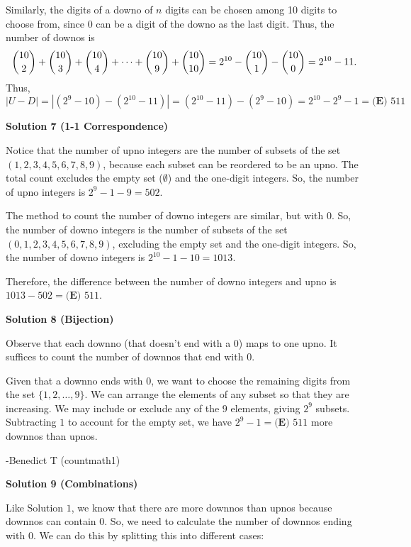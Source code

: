 \begin{enumerate}
 Similarly, the digits of a downo of $n$ digits can be chosen among 10 digits to choose from, since $0$ can be a digit of the downo as the last digit. Thus, the number of downos is 
 \[\binom{10}{2} + \binom{10}{3} + \binom{10}{4} + \cdots + \dbinom{10}{9} + \dbinom{10}{10} = 2^{10} - \binom{10}{1} - \binom{10}{0} = 2^{10} - 11.\] Thus, 
 \[|U - D| = |(2^9 - 10) - (2^{10} - 11)| = (2^{10} - 11) - (2^9 - 10) = 2^{10} - 2^9 - 1 = \boxed{\textbf{(E) }511}\]




\textbf{Solution 7 (1-1 Correspondence)}

Notice that the number of upno integers are the number of subsets of the set $(1, 2, 3, 4, 5, 6, 7, 8, 9)$, because each subset can be reordered to be an upno. The total count excludes the empty set ($\emptyset$) and the one-digit integers. So, the number of upno integers is $2^9-1-9=502$.

 The method to count the number of downo integers are similar, but with $0$. So, the number of downo integers is the number of subsets of the set $(0, 1, 2, 3, 4, 5, 6, 7, 8, 9)$, excluding the empty set and the one-digit integers. So, the number of downo integers is $2^{10}-1-10=1013$.

 Therefore, the difference between the number of downo integers and upno is $1013-502=\boxed{\textbf{(E) }511}$.

 



\textbf{Solution 8 (Bijection)}

Observe that each downno (that doesn't end with a $0$) maps to one upno. It suffices to count the number of downnos that end with $0$. 

 Given that a downno ends with $0$, we want to choose the remaining digits from the set $\{1, 2, \ldots, 9\}$. We can arrange the elements of any subset so that they are increasing. We may include or exclude any of the $9$ elements, giving $2^{9}$ subsets. Subtracting $1$ to account for the empty set, we have $2^9 - 1 = \boxed{\textbf{(E) }511}$ more downnos than upnos. 

 -Benedict T (countmath1)

 



\textbf{Solution 9 (Combinations)}

Like Solution $1$, we know that there are more downnos than upnos because downnos can contain $0$. So, we need to calculate the number of downnos ending with $0$. We can do this by splitting this into different cases:


\end{enumerate}
